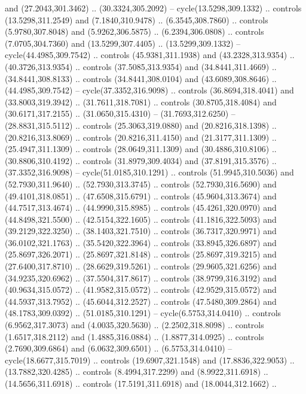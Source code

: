\begin{scope}[cm={{1.25,0.0,0.0,-1.25,(0.0,743.43331)}}]
    and (27.2043,301.3462) .. (30.3324,305.2092) -- cycle(13.5298,309.1332) ..
    controls (13.5298,311.2549) and (7.1840,310.9478) .. (6.3545,308.7860) ..
    controls (5.9780,307.8048) and (5.9262,306.5875) .. (6.2394,306.0808) ..
    controls (7.0705,304.7360) and (13.5299,307.4405) .. (13.5299,309.1332) --
    cycle(44.4985,309.7542) .. controls (45.9381,311.1938) and (43.2328,313.9354)
    .. (40.3726,313.9354) .. controls (37.5085,313.9354) and (34.8441,311.4669) ..
    (34.8441,308.8133) .. controls (34.8441,308.0104) and (43.6089,308.8646) ..
    (44.4985,309.7542) -- cycle(37.3352,316.9098) .. controls (36.8694,318.4041)
    and (33.8003,319.3942) .. (31.7611,318.7081) .. controls (30.8705,318.4084)
    and (30.6171,317.2155) .. (31.0650,315.4310) -- (31.7693,312.6250) --
    (28.8831,315.5112) .. controls (25.3063,319.0880) and (20.8216,318.1398) ..
    (20.8216,313.8069) .. controls (20.8216,311.4150) and (21.3177,311.1309) ..
    (25.4947,311.1309) .. controls (28.0649,311.1309) and (30.4886,310.8106) ..
    (30.8806,310.4192) .. controls (31.8979,309.4034) and (37.8191,315.3576) ..
    (37.3352,316.9098) -- cycle(51.0185,310.1291) .. controls (51.9945,310.5036)
    and (52.7930,311.9640) .. (52.7930,313.3745) .. controls (52.7930,316.5690)
    and (49.4101,318.0851) .. (47.6508,315.6791) .. controls (45.9604,313.3674)
    and (44.7517,313.4674) .. (44.9990,315.8985) .. controls (45.4261,320.0970)
    and (44.8498,321.5500) .. (42.5154,322.1605) .. controls (41.1816,322.5093)
    and (39.2129,322.3250) .. (38.1403,321.7510) .. controls (36.7317,320.9971)
    and (36.0102,321.1763) .. (35.5420,322.3964) .. controls (33.8945,326.6897)
    and (25.8697,326.2071) .. (25.8697,321.8148) .. controls (25.8697,319.3215)
    and (27.6400,317.8710) .. (28.6629,319.5261) .. controls (29.9605,321.6256)
    and (34.9235,320.6962) .. (37.5504,317.8617) .. controls (38.9799,316.3192)
    and (40.9634,315.0572) .. (41.9582,315.0572) .. controls (42.9529,315.0572)
    and (44.5937,313.7952) .. (45.6044,312.2527) .. controls (47.5480,309.2864)
    and (48.1783,309.0392) .. (51.0185,310.1291) -- cycle(6.5753,314.0410) ..
    controls (6.9562,317.3073) and (4.0035,320.5630) .. (2.2502,318.8098) ..
    controls (1.6517,318.2112) and (1.4885,316.0884) .. (1.8877,314.0925) ..
    controls (2.7690,309.6864) and (6.0632,309.6501) .. (6.5753,314.0410) --
    cycle(18.6677,315.7019) .. controls (19.6907,321.1548) and (17.8836,322.9053)
    .. (13.7882,320.4285) .. controls (8.4994,317.2299) and (8.9922,311.6918) ..
    (14.5656,311.6918) .. controls (17.5191,311.6918) and (18.0044,312.1662) ..

\end{scope}
